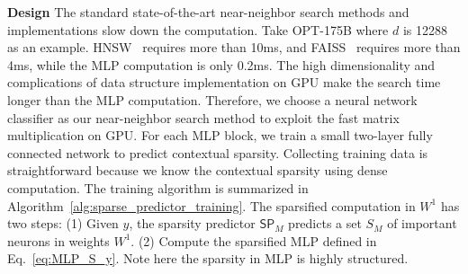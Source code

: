 \textbf{Design} The standard state-of-the-art near-neighbor search methods and implementations slow down the computation. Take OPT-175B where $d$ is 12288 as an example. HNSW~\cite{malkov2018efficient} requires more than 10ms, and FAISS~\cite{johnson2019billion} requires more than 4ms, while the MLP computation is only 0.2ms. The high dimensionality and complications of data structure implementation on GPU make the search time longer than the MLP computation. Therefore, we choose a neural network classifier as our near-neighbor search method to exploit the fast matrix multiplication on GPU. For each MLP block, we train a small two-layer fully connected network to predict contextual sparsity. Collecting training data is straightforward because we know the contextual sparsity using dense computation. The training algorithm is summarized in Algorithm~\ref{alg:sparse_predictor_training}. The sparsified computation in $W^1$ has two steps: (1) Given $y$, the sparsity predictor $\mathsf{SP}_{M}$ predicts a set $S_M$ of important neurons in weights $W^1$. (2) Compute the sparsified MLP defined in Eq.~\eqref{eq:MLP_S_y}. Note here the sparsity in MLP is highly structured.









